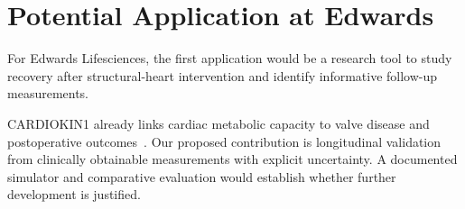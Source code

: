 \section{Potential Application at Edwards}
For Edwards Lifesciences, the first application would be a research tool to study recovery after structural-heart intervention and identify informative follow-up measurements.

CARDIOKIN1 already links cardiac metabolic capacity to valve disease and postoperative outcomes~\cite{cardiokin2021}. Our proposed contribution is longitudinal validation from clinically obtainable measurements with explicit uncertainty. A documented simulator and comparative evaluation would establish whether further development is justified.




